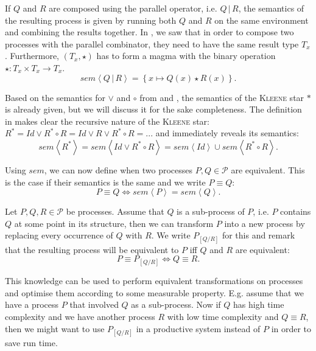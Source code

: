 If $Q$ and $R$ are composed using the parallel operator, i.e. $Q \,|\, R$, the semantics of the resulting process is given by running both $Q$ and $R$ on the same environment and combining the results together. In , we saw that in order to compose two processes with the parallel combinator, they need to have the same result type $T_x$. Furthermore, $\left( T_x, \star \right)$ has to form a magma with the binary operation $\star \colon T_x \times T_x \to T_x$.
\begin{equation}
  \label{eqn:sem_parallel}
  sem \left\langle Q \,|\, R \right\rangle = \left\{ x \mapsto Q \left( x \right) \star R \left( x \right) \right\}.
\end{equation}

Based on the semantics for $\vee$ and $\circ$ from  and , the semantics of the \textsc{Kleene} star $*$ is already given, but we will discuss it for the sake completeness. The definition in  makes clear the recursive nature of the \textsc{Kleene} star: $R^* = Id \vee R^* \circ R = Id \vee R \vee R^* \circ R =  ...$ and immediately reveals its semantics:
\begin{equation}
  \label{eqn:sem_kleene}
  sem \left\langle R^* \right\rangle = sem \left\langle Id \vee R^* \circ R \right\rangle = sem \left\langle Id \right\rangle \cup sem \left\langle R^* \circ R \right\rangle.
\end{equation}

Using $sem$, we can now define when two processes $P, Q \in \mathcal{P}$ are equivalent. This is the case if their semantics is the same and we write $P \equiv Q$:
\begin{equation}
  \label{eqn:equivalence}
  P \equiv Q \Leftrightarrow sem \left\langle P \right\rangle = sem \left\langle Q \right\rangle.
\end{equation}

Let $P, Q, R \in \mathcal{P}$ be processes. Assume that $Q$ is a sub-process of $P$, i.e. $P$ contains $Q$ at some point in its structure, then we can transform $P$ into a new process by replacing every occurrence of $Q$ with $R$. We write $P_{\left[ Q / R \right]}$ for this and remark that the resulting process will be equivalent to $P$ iff $Q$ and $R$ are equivalent:
\begin{equation}
  P \equiv P_{\left[ Q / R \right]} \Leftrightarrow Q \equiv R.
\end{equation}

This knowledge can be used to perform equivalent transformations on processes and optimise them according to some measurable property. E.g. assume that we have a process $P$ that involved $Q$ as a sub-process. Now if $Q$ has high time complexity and we have another process $R$ with low time complexity and $Q \equiv R$, then we might want to use $P_{\left[ Q / R \right]}$ in a productive system instead of $P$ in order to save run time.

